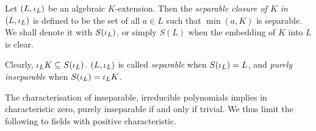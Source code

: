\documentclass[main.tex]{subfiles}
\begin{document}
\begin{dfn} 
  
  Let $(L,\iota_L)$ be an algebraic $K$-extension. 
  Then the \emph{separable closure of $K$ in $(L,\iota_L)$} is defined to be
  the set of all $a \in L$ such that $\min(a,K)$ is separable. 
  We shall denote it with $S(\iota_L)$,
  or simply $S(L)$ when the embedding of $K$ into $L$ is clear. 

  Clearly, $\iota_L K \subseteq S(\iota_L)$. 
  $(L,\iota_L)$ is called \emph{separable} when $S(\iota_L) = L$,
  and \emph{purely inseparable} when $S(\iota_L) = \iota_L K$. 
\end{dfn}

\begin{rmk}
  The 
  {characterisation of inseparable, irreducible polynomials} implies 
  in characteristic zero, purely inseparable if and only if trivial. 
  We thus limit the following to fields with positive characteristic.
\end{rmk}
\end{document}
